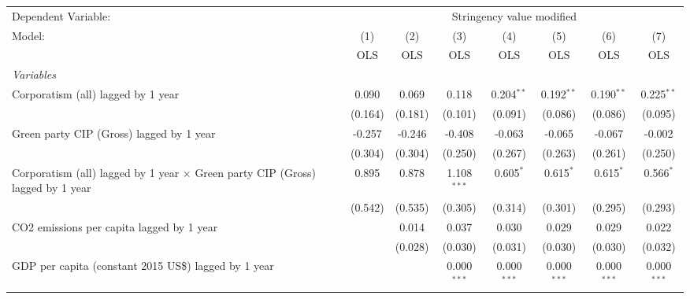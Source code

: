 
\begingroup
\centering
\begin{tabular}{lccccccc}
   \toprule
   Dependent Variable: & \multicolumn{7}{c}{Stringency value modified}\\
   Model:                                                                                & (1)     & (2)     & (3)           & (4)           & (5)           & (6)           & (7)\\  
                                                                                         &  OLS    & OLS     & OLS           & OLS           & OLS           & OLS           & OLS\\  
   \midrule
   \emph{Variables}\\
   Corporatism (all) lagged by 1 year                                                    & 0.090   & 0.069   & 0.118         & 0.204$^{**}$  & 0.192$^{**}$  & 0.190$^{**}$  & 0.225$^{**}$\\   
                                                                                         & (0.164) & (0.181) & (0.101)       & (0.091)       & (0.086)       & (0.086)       & (0.095)\\   
   Green party CIP (Gross) lagged by 1 year                                              & -0.257  & -0.246  & -0.408        & -0.063        & -0.065        & -0.067        & -0.002\\   
                                                                                         & (0.304) & (0.304) & (0.250)       & (0.267)       & (0.263)       & (0.261)       & (0.250)\\   
   Corporatism (all) lagged by 1 year $\times$ Green party CIP (Gross) lagged by 1 year  & 0.895   & 0.878   & 1.108$^{***}$ & 0.605$^{*}$   & 0.615$^{*}$   & 0.615$^{*}$   & 0.566$^{*}$\\   
                                                                                         & (0.542) & (0.535) & (0.305)       & (0.314)       & (0.301)       & (0.295)       & (0.293)\\   
   CO2 emissions per capita lagged by 1 year                                             &         & 0.014   & 0.037         & 0.030         & 0.029         & 0.029         & 0.022\\   
                                                                                         &         & (0.028) & (0.030)       & (0.031)       & (0.030)       & (0.030)       & (0.032)\\   
   GDP per capita (constant 2015 US\$) lagged by 1 year                                  &         &         & 0.000$^{***}$ & 0.000$^{***}$ & 0.000$^{***}$ & 0.000$^{***}$ & 0.000$^{***}$\\   

\end{tabular}
